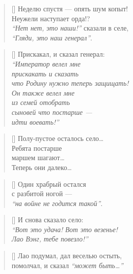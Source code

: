 \documentclass[14pt]{memoir}
\begin{document}
\begin{verse}[\versewidth]
Неделю спустя --- опять шум копыт! \\
Неужели наступает орда!? \\
\emph{``Нет нет, это наши!''} сказали в селе, \\
\emph{``Гляди, это наш генерал''}. \\
\end{verse}

\begin{verse}[\versewidth]
Прискакал, и сказал генерал: \\
\emph{``Император велел мне \\
прискакать и сказать \\
что Родину нужно теперь защищать! \\
Он также велел мне \\
из семей отобрать \\
сыновей что постарше ---  \\
идти воевать!''} \\
\end{verse}

\begin{verse}[\versewidth]
Полу-пустое осталось село\ldots \\
Ребята постарше \\
маршем шагают\ldots \\
Теперь они далеко\ldots \\
\end{verse}

\begin{verse}[\versewidth]
Один храбрый остался \\
с разбитой ногой ---  \\
\emph{``на войне не годится такой''}. \\
\end{verse}

\begin{verse}[\versewidth]
И снова сказало село: \\
\emph{``Вот это удача! Вот это везенье! \\
Лао Вэнг, тебе повезло!''} \\
\end{verse}

\begin{verse}[\versewidth]
Лао подумал, дал веселью остыть, \\
помолчал, и сказал \emph{``может быть\ldots''} 
\end{verse}
\end{document}
